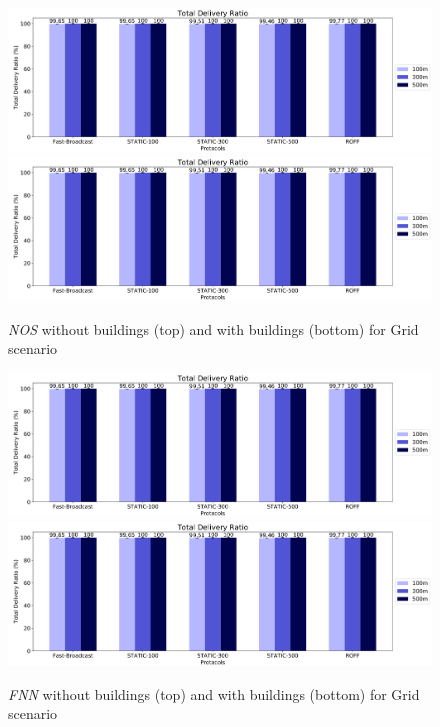 		\begin{figure}[H]
			\centering
			\includegraphics[width=1.0\textwidth]{immagini/grid-300/b0/nos}
			\includegraphics[width=1.0\textwidth]{immagini/grid-300/b1/nos}
			\caption{\textit{NOS} without buildings (top) and with buildings (bottom) for Grid scenario}
			\label{fig:grid-nos}
		\end{figure}
	
		\begin{figure}[H]
			\centering
			\includegraphics[width=1.0\textwidth]{immagini/grid-300/b0/fnn}
			\includegraphics[width=1.0\textwidth]{immagini/grid-300/b1/fnn}
			\caption{\textit{FNN} without buildings (top) and with buildings (bottom) for Grid scenario}
			\label{fig:grid-fnn}
		\end{figure}
	
